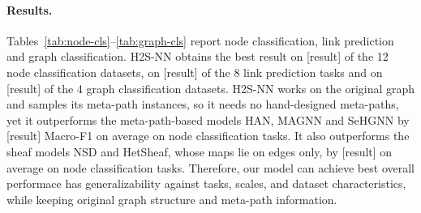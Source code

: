 \documentclass{article}
\newcommand{\res}{{\scriptsize[result]}}
\begin{document}
\paragraph{Results.} Tables~\ref{tab:node-cls}--\ref{tab:graph-cls} report node classification, link prediction and graph classification. H2S-NN obtains the best result on \res{} of the 12 node classification datasets, on \res{} of the 8 link prediction tasks and on \res{} of the 4 graph classification datasets. H2S-NN works on the original graph and samples its meta-path instances, so it needs no hand-designed meta-paths, yet it outperforms the meta-path-based models HAN, MAGNN and SeHGNN by \res{} Macro-F1 on average on node classification tasks. It also outperforms the sheaf models NSD and HetSheaf, whose maps lie on edges only, by \res{} on average on node classification tasks. Therefore, our model can achieve best overall performace has generalizability against tasks, scales, and dataset characteristics, while keeping original graph structure and meta-path information.
\end{document}
